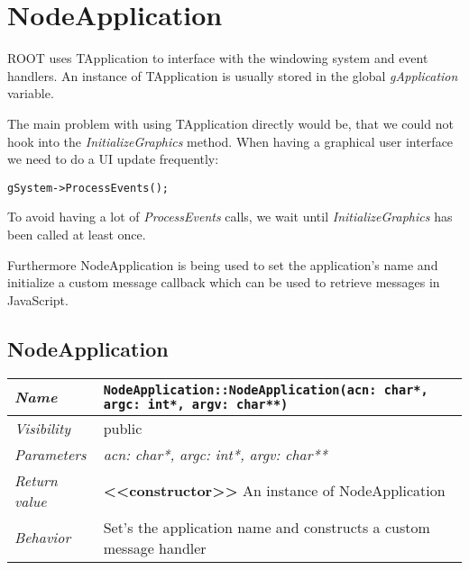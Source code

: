\chapter{NodeApplication}
ROOT uses TApplication to interface with the windowing system and event handlers.
An instance of TApplication is usually stored in the global \textit{gApplication} variable.

The main problem with using TApplication directly would be, that we could not hook into the \textit{InitializeGraphics} method.
When having a graphical user interface we need to do a UI update frequently:
\begin{verbatim}
gSystem->ProcessEvents();
\end{verbatim}
To avoid having a lot of \textit{ProcessEvents} calls, we wait until \textit{InitializeGraphics} has been called at least once.

Furthermore NodeApplication is being used to set the application's name and initialize a custom message callback which can be used to retrieve messages in JavaScript.

\section{NodeApplication}
\begin{longtable}{p{3cm} @{\hskip 1cm} p{12cm}}
 \hline
\textit{Name} & \texttt{NodeApplication::NodeApplication(acn: char*, argc: int*, argv: char**)}\\
\hline
 \textit{Visibility} & public\\
\hline
\textit{Parameters} & \textit{acn: char*, argc: int*, argv: char**}\\
\hline
\textit{Return value} & \textbf{<<constructor>>} An instance of NodeApplication\\
  \hline
 \textit{Behavior} & Set's the application name and constructs a custom message handler \\
\hline
\end{longtable} \pagebreak
